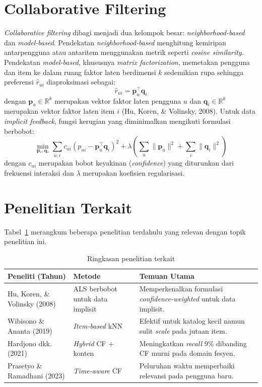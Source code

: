 \documentclass[12pt,a4paper]{report}
\begin{document}
\begin{onehalfspace}
\section{Collaborative Filtering}
\emph{Collaborative filtering} dibagi menjadi dua kelompok besar:
\emph{neighborhood-based} dan \emph{model-based}. Pendekatan
\emph{neighborhood-based} menghitung kemiripan antarpengguna atau antaritem
menggunakan metrik seperti \emph{cosine similarity}. Pendekatan
\emph{model-based}, khususnya \emph{matrix factorization}, memetakan
pengguna dan item ke dalam ruang faktor laten berdimensi $k$ sedemikian
rupa sehingga preferensi $\hat{r}_{ui}$ diaproksimasi sebagai:
\begin{equation}
\hat{r}_{ui} = \mathbf{p}_u^{\top} \mathbf{q}_i
\label{eq:mf}
\end{equation}
dengan $\mathbf{p}_u \in \mathbb{R}^k$ merupakan vektor faktor laten
pengguna $u$ dan $\mathbf{q}_i \in \mathbb{R}^k$ merupakan vektor faktor
laten item $i$ (Hu, Koren, \& Volinsky, 2008). Untuk data \emph{implicit
feedback}, fungsi kerugian yang diminimalkan mengikuti formulasi berbobot:
\begin{equation}
\min_{\mathbf{p}_*, \mathbf{q}_*} \sum_{u,i} c_{ui}\left(p_{ui} -
\mathbf{p}_u^{\top}\mathbf{q}_i\right)^2 + \lambda\left(\sum_u
\lVert\mathbf{p}_u\rVert^2 + \sum_i \lVert\mathbf{q}_i\rVert^2\right)
\label{eq:loss}
\end{equation}
dengan $c_{ui}$ merupakan bobot keyakinan (\emph{confidence}) yang
diturunkan dari frekuensi interaksi dan $\lambda$ merupakan koefisien
regularisasi.

\section{Penelitian Terkait}
Tabel~\ref{tab:terkait} merangkum beberapa penelitian terdahulu yang
relevan dengan topik penelitian ini.

\begin{table}[htb]
\centering
\caption{Ringkasan penelitian terkait}
\label{tab:terkait}
\begin{tabularx}{\textwidth}{@{}p{3.4cm}p{4.4cm}X@{}}
\toprule
\textbf{Peneliti (Tahun)} & \textbf{Metode} & \textbf{Temuan Utama} \\
\midrule
Hu, Koren, \& Volinsky (2008) & ALS berbobot untuk data implisit &
  Memperkenalkan formulasi \emph{confidence-weighted} untuk data implisit. \\
Wibisono \& Ananta (2019) & \emph{Item-based} kNN &
  Efektif untuk katalog kecil namun sulit \emph{scale} pada jutaan item. \\
Hardjono dkk. (2021) & \emph{Hybrid} CF + konten &
  Meningkatkan \emph{recall} 9\% dibanding CF murni pada domain fesyen. \\
Prasetyo \& Ramadhani (2023) & \emph{Time-aware} CF &
  Peluruhan waktu memperbaiki relevansi pada pengguna baru. \\
\bottomrule
\end{tabularx}
\end{table}


\end{onehalfspace}
\end{document}
